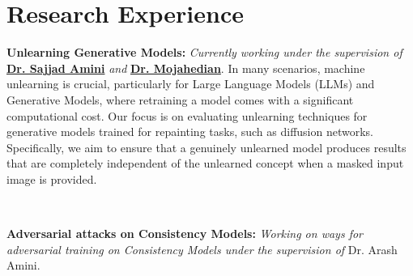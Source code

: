 \documentclass[letterpaper,11pt]{article}
\newcommand{\resumeSubHeadingListStart}{\begin{itemize}[leftmargin=0.15in, label={}]}
\newcommand{\resumeSubHeadingListEnd}{\end{itemize}}
\begin{document}
	
	
	
	
        \section{Research Experience}
        \vspace{2pt}
        \resumeSubHeadingListStart
        \small{ \item{

        \textbf{Unlearning Generative Models:} 
        \textit{Currently working under the supervision of} 
        \href{https://scholar.google.com/citations?user=24GngZYAAAAJ&hl=en}{\textbf{Dr. Sajjad Amini}} 
        \textit{and} 
        \href{https://scholar.google.com/citations?user=SqASevMAAAAJ&hl=en}{\textbf{Dr. Mojahedian}}. 
        In many scenarios, machine unlearning is crucial, particularly for Large Language Models (LLMs) and Generative Models, where retraining a model comes with a significant computational cost. 
        Our focus is on evaluating unlearning techniques for generative models trained for repainting tasks, such as diffusion networks. Specifically, we aim to ensure that a genuinely unlearned model produces results that are completely independent of the unlearned concept when a masked input image is provided.
        } \\
        \vspace{4pt}
        \item{
            \textbf{Adversarial attacks on Consistency Models:}
            \textit{Working on ways for adversarial training on Consistency Models under the supervision of} 
            Dr. Arash Amini.
            }
        }
        \resumeSubHeadingListEnd


\end{document}
